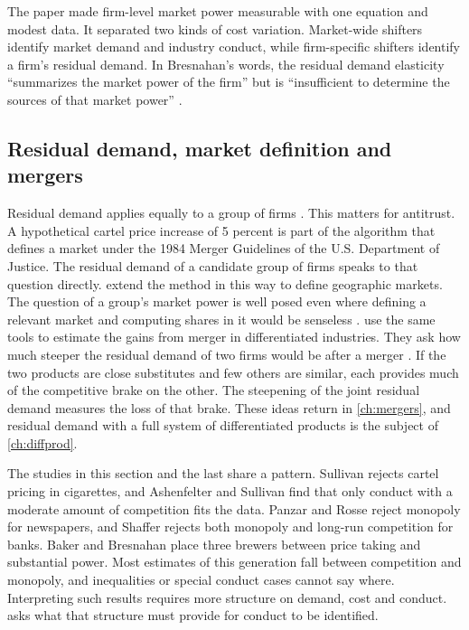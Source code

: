  The paper made firm-level market power measurable with one equation and modest data.
It separated two kinds of cost variation. Market-wide shifters identify market demand and industry conduct,
while firm-specific shifters identify a firm's residual demand. In Bresnahan's words, the residual demand
elasticity ``summarizes the market power of the firm'' but is ``insufficient to determine the sources of that
market power'' \citep[p.~1049]{Bresnahan1989}.

\subsection{Residual demand, market definition and mergers}\label{sec:03-bb-antitrust}

Residual demand applies equally to a group of firms \citep[n.~7]{BakerBresnahan1988}. This matters for
antitrust. A hypothetical cartel price increase of 5 percent is part of the algorithm that defines a market
under the 1984 Merger Guidelines of the U.S. Department of Justice. The residual demand of a candidate group
of firms speaks to that question directly. \citet{ScheffmanSpiller1987} extend the method in this way to
define geographic markets. The question of a group's market power is well posed even where defining a
relevant market and computing shares in it would be senseless \citep[n.~44]{Bresnahan1989}. \citet{BakerBresnahan1985} use the same tools to estimate the gains
from merger in differentiated industries. They ask how much steeper the residual demand of two firms would
be after a merger \citep[p.~1050]{Bresnahan1989}. If the two products are close substitutes and few others
are similar, each provides much of the competitive brake on the other. The steepening of the joint residual
demand measures the loss of that brake. These ideas return in \cref{ch:mergers}, and residual demand with a
full system of differentiated products is the subject of \cref{ch:diffprod}.

The studies in this section and the last share a pattern. Sullivan rejects cartel pricing in cigarettes, and
Ashenfelter and Sullivan find that only conduct with a moderate amount of competition fits the data. Panzar and
Rosse reject monopoly for newspapers, and Shaffer rejects both monopoly and long-run competition for banks. Baker
and Bresnahan place
three brewers between price taking and
substantial power. Most estimates of this generation fall between competition and monopoly, and inequalities
or special conduct cases cannot say where. Interpreting such results requires more structure on demand,
cost and conduct.  asks what that structure must provide for conduct to be
identified.
